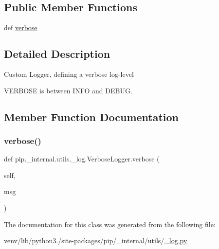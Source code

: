 \subsection*{Public Member Functions}
\begin{DoxyCompactItemize}
\item 
def \hyperlink{classpip_1_1__internal_1_1utils_1_1__log_1_1VerboseLogger_a4e77a629252e75f737a4a1813b699485}{verbose}
\end{DoxyCompactItemize}


\subsection{Detailed Description}
\begin{DoxyVerb}Custom Logger, defining a verbose log-level

VERBOSE is between INFO and DEBUG.
\end{DoxyVerb}
 

\subsection{Member Function Documentation}
\mbox{\label{classpip_1_1__internal_1_1utils_1_1__log_1_1VerboseLogger_a4e77a629252e75f737a4a1813b699485}} 
\subsubsection{\texorpdfstring{verbose()}{verbose()}}
{\footnotesize\ttfamily def pip.\+\_\+internal.\+utils.\+\_\+log.\+Verbose\+Logger.\+verbose (\begin{DoxyParamCaption}\item[{}]{self,  }\item[{}]{msg }\end{DoxyParamCaption})}



The documentation for this class was generated from the following file\+:\begin{DoxyCompactItemize}
\item 
venv/lib/python3./site-\/packages/pip/\+\_\+internal/utils/\hyperlink{__log_8py}{\+\_\+log.\+py}\end{DoxyCompactItemize}
